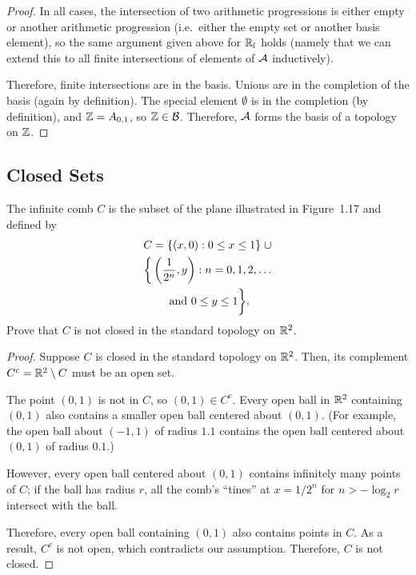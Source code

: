 \documentclass[twocolumn, noxcolor, maketitle]{mathnotes-hw}
\def\basis{\mathcal{B}}
\begin{document}
\begin{proof}
  In all cases, the intersection of two arithmetic progressions is either empty or
  another arithmetic progression (i.e.~either the empty set or another basis
  element), so the same argument given above for $\mathbb{R}_l$ holds (namely that we can
  extend this to all finite intersections of elements of $\mathcal{A}$ inductively).

  Therefore, finite intersections are in the basis. Unions are in the completion
  of the basis (again by definition). The special element $\emptyset$ is in the
  completion (by definition), and $\mathbb{Z} = A_{0,1}$, so $\Z \in \basis$. Therefore,
  $\mathcal{A}$ forms the basis of a topology on $\mathbb{Z}$.
\end{proof}

\pagebreak
\subsection{Closed Sets}
\begin{problem}[1.27(a)]
  The infinite comb $C$ is the subset of the plane illustrated in Figure~1.17
  and defined by
  \begin{multline*}
    C = \{(x,0) : 0 \le x \le 1\} \;\cup \\
    \bigg\{ \left( \frac{1}{2^n}, y \right) : n = 0,1,2, \dots \\
      \text{ and } 0 \le y \le 1 \bigg\}.   
  \end{multline*}
  Prove that $C$ is not closed in the standard topology on $\mathbb{R}^2$.
\end{problem}
\begin{proof}
  Suppose $C$ is closed in the standard topology on $\mathbb{R}^2$. Then, its complement
  $C^c = \mathbb{R}^2 \setminus C$ must be an open set.

  The point $(0, 1)$ is not in $C$, so $(0, 1) \in C^c$. Every open ball in $\mathbb{R}^2$
  containing $(0, 1)$ also contains a smaller open ball centered about $(0, 1)$.
  (For example, the open ball about $(-1, 1)$ of radius $1.1$ contains the open
  ball centered about $(0, 1)$ of radius $0.1$.)

  However, every open ball centered about $(0, 1)$ contains infinitely many
  points of $C$; if the ball has radius $r$, all the comb's ``tines'' at $x =
  1/2^n$ for $n > - \log_2 r$ intersect with the ball.

  Therefore, every open ball containing $(0, 1)$ also contains points in $C$. As
  a result, $C^c$ is not open, which contradicts our assumption. Therefore, $C$
  is not closed.
\end{proof}
\end{document}

